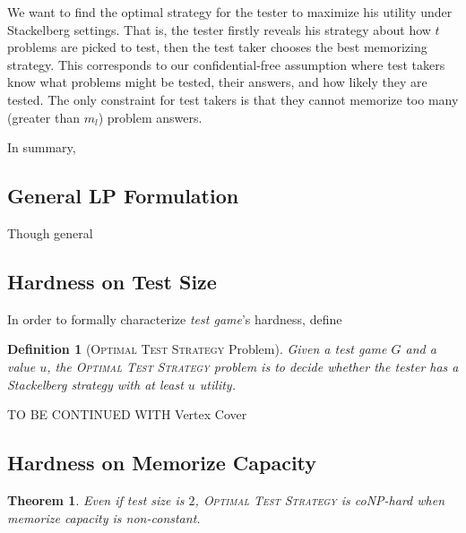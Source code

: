 \documentclass{article}
\newtheorem{theorem}{Theorem}
\newtheorem{definition}{Definition}
\begin{document}
We want to find the optimal strategy for the tester to maximize his utility
under Stackelberg settings. That is, the tester firstly reveals his strategy
about how $t$ problems are picked to test, then the test taker chooses the best
memorizing strategy. This corresponds to our confidential-free assumption where
test takers know what problems might be tested, their answers, and how likely
they are tested. The only constraint for test takers is that they cannot
memorize too many (greater than $m_l$) problem answers. 

In summary, 

\subsection{General LP Formulation}

Though general

\subsection{Hardness on Test Size}

In order to formally characterize \emph{test game}'s hardness, define

\begin{definition}[\textsc{Optimal Test Strategy} Problem]
Given a test game $G$ and a value $u$, the \textsc{Optimal Test Strategy}
problem is to decide whether the tester has a Stackelberg strategy with at
least $u$ utility.
\end{definition}

TO BE CONTINUED WITH Vertex Cover

\subsection{Hardness on Memorize Capacity}


\begin{theorem}
Even if test size is $2$, \textsc{Optimal Test Strategy} is coNP-hard when
memorize capacity is non-constant.
\end{theorem}
\end{document}
